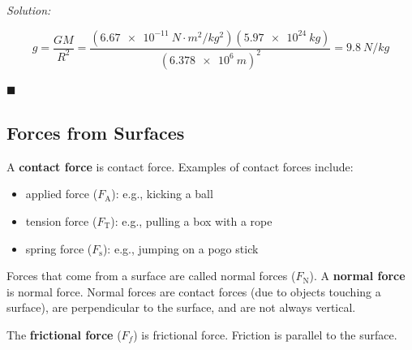 \documentclass[dvipsnames]{article}
\begin{document}
\textit{Solution:}

\begin{equation*}
    g = \frac{GM}{R^2} = \frac{(\SI{6.67e-11}{N\cdot m^2/kg^2})(\SI{5.97e24}{kg})}{(\SI{6.378e6}{m})^2} = \boxed{\SI{9.8}{N/kg}}
\end{equation*}

\hfill $\blacksquare$


\subsection{Forces from Surfaces}

A \textbf{\gls{contact force}} is \glsdesc{contact force}. Examples of contact forces include:

\begin{itemize}[topsep=0pt,itemsep=0pt]
    \item applied force ($F_\mathrm{A}$): e.g., kicking a ball
    \item tension force ($F_\mathrm{T}$): e.g., pulling a box with a rope
    \item spring force ($F_\mathrm{s}$): e.g., jumping on a pogo stick
\end{itemize}


Forces that come from a surface are called normal forces ($F_\mathrm{N}$). A \textbf{\gls{normal force}} is \glsdesc{normal force}. Normal forces are contact forces (due to objects touching a surface), are perpendicular to the surface, and are not always vertical.

\begin{center}
\hspace{1.5cm}
\end{center}

The \textbf{\gls{frictional force}} ($F_f$) is \glsdesc{frictional force}. Friction is parallel to the surface.
\end{document}
